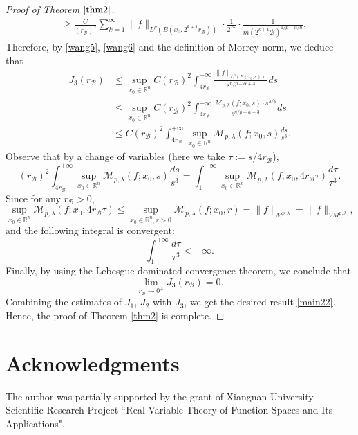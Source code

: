 \documentclass[10pt, reqno]{amsart}
\theoremstyle{definition}
\theoremstyle{remark}
\numberwithin{equation}{section}
\begin{document}
\begin{proof}[Proof of Theorem $\ref{thm2}$]
\begin{equation}
\begin{split}
&\geq \frac{C}{(r_{\mathcal{B}})^2}\sum_{k=1}^{\infty}\big\|f\big\|_{L^p(B(x_0,2^{k+1}r_{\mathcal{B}}))}\cdot
\frac{1}{2^{2k}}\cdot\frac{1}{m(2^{k+1}\mathcal{B})^{1/p-\alpha/n}}.
\end{split}
\end{equation}
Therefore, by \eqref{wang5}, \eqref{wang6} and the definition of Morrey norm, we deduce that
\begin{align*}
J_3(r_{\mathcal{B}})&\leq \sup_{x_0\in\mathbb R^n}
C(r_{\mathcal{B}})^2\int_{4r_{\mathcal{B}}}^{+\infty}\frac{\|f\|_{L^p(B(x_0,s))}}{s^{n/p-\alpha+3}}ds\\
&\leq \sup_{x_0\in\mathbb R^n}
C(r_{\mathcal{B}})^2\int_{4r_{\mathcal{B}}}^{+\infty}\frac{\mathcal{M}_{p,\lambda}(f;x_0,s)\cdot s^{{\lambda}/p}}{s^{n/p-\alpha+3}}ds\\
&\leq C(r_{\mathcal{B}})^2\int_{4r_{\mathcal{B}}}^{+\infty}\sup_{x_0\in\mathbb R^n}\mathcal{M}_{p,\lambda}(f;x_0,s)\frac{ds}{s^3}.
\end{align*}
Observe that by a change of variables (here we take $\tau:=s/{4r_{\mathcal{B}}}$),
\begin{equation*}
(r_{\mathcal{B}})^2\int_{4r_{\mathcal{B}}}^{+\infty}\sup_{x_0\in\mathbb R^n}\mathcal{M}_{p,\lambda}(f;x_0,s)\frac{ds}{s^3}
=\int_1^{+\infty}\sup_{x_0\in\mathbb R^n}\mathcal{M}_{p,\lambda}(f;x_0,4r_{\mathcal{B}}\tau)\frac{d\tau}{\tau^3}.
\end{equation*}
Since for any $r_{\mathcal{B}}>0$,
\begin{equation*}
\sup_{x_0\in\mathbb R^n}\mathcal{M}_{p,\lambda}(f;x_0,4r_{\mathcal{B}}\tau)
\leq\sup_{x_0\in \mathbb R^n,r>0}\mathcal{M}_{p,\lambda}(f;x_0,r)=\big\|f\big\|_{{M}^{p,\lambda}}
=\big\|f\big\|_{VM^{p,\lambda}},
\end{equation*}
and the following integral is convergent:
\begin{equation*}
\int_1^{+\infty}\frac{d\tau}{\tau^3}<+\infty.
\end{equation*}
Finally, by using the Lebesgue dominated convergence theorem, we conclude that
\begin{equation*}
\lim_{r_{\mathcal{B}}\to 0^{+}}J_3(r_{\mathcal{B}})=0.
\end{equation*}
Combining the estimates of $J_1$, $J_2$ with $J_3$, we get the desired result \eqref{main22}. Hence, the proof of Theorem \ref{thm2} is complete.
\end{proof}

\section*{Acknowledgments}
The author was partially supported by the grant of Xiangnan University Scientific Research Project ``Real-Variable Theory of Function Spaces and Its Applications".
\end{document}
